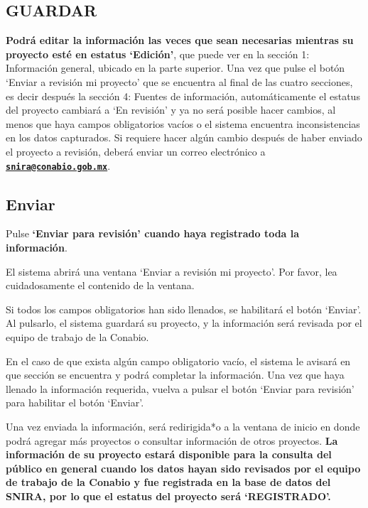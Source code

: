 \documentclass[
]{book}
\begin{document}
\hypertarget{guardar-9}{%
\subsection*{GUARDAR}\label{guardar-9}}

\textbf{Podrá editar la información las veces que sean necesarias mientras su proyecto esté en estatus `Edición'}, que puede ver en la sección 1: Información general, ubicado en la parte superior. Una vez que pulse el botón `Enviar a revisión mi proyecto' que se encuentra al final de las cuatro secciones, es decir después la sección 4: Fuentes de información, automáticamente el estatus del proyecto cambiará a `En revisión' y ya no será posible hacer cambios, al menos que haya campos obligatorios vacíos o el sistema encuentra inconsistencias en los datos capturados. Si requiere hacer algún cambio después de haber enviado el proyecto a revisión, deberá enviar un correo electrónico a \textbf{\href{mailto:snira@conabio.gob.mx}{\nolinkurl{snira@conabio.gob.mx}}}.

\hypertarget{enviar}{%
\subsection*{Enviar}\label{enviar}}

Pulse \textbf{`Enviar para revisión' cuando haya registrado toda la información}.

El sistema abrirá una ventana `Enviar a revisión mi proyecto'. Por favor, lea cuidadosamente el contenido de la ventana.

Si todos los campos obligatorios han sido llenados, se habilitará el botón `Enviar'. Al pulsarlo, el sistema guardará su proyecto, y la información será revisada por el equipo de trabajo de la Conabio.

En el caso de que exista algún campo obligatorio vacío, el sistema le avisará en que sección se encuentra y podrá completar la información. Una vez que haya llenado la información requerida, vuelva a pulsar el botón `Enviar para revisión' para habilitar el botón `Enviar'.

Una vez enviada la información, será redirigida*o a la ventana de inicio en donde podrá agregar más proyectos o consultar información de otros proyectos.
\textbf{La información de su proyecto estará disponible para la consulta del público en general cuando los datos hayan sido revisados por el equipo de trabajo de la Conabio y fue registrada en la base de datos del SNIRA, por lo que el estatus del proyecto será `REGISTRADO'.}

  
\end{document}
